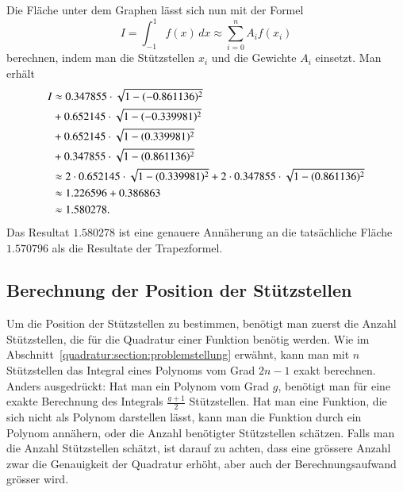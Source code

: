 Die Fläche unter dem Graphen lässt sich nun mit der Formel 
\begin{equation}
    I 
    =
    \int_{-1}^{1} f(x)\,dx 
    \approx
    \sum_{i=0}^{n} A_{i} f(x_{i})
\end{equation}
berechnen, indem man die Stützstellen $x_{i}$ und die Gewichte $A_{i}$ einsetzt.
Man erhält
\begin{align}
    \centering
    I 
    &\approx 
    0.347855 \cdot \sqrt{1-(-0.861136)^{2}} 
    \notag
    \\
    &+ 
    0.652145 \cdot \sqrt{1-(-0.339981)^{2}} 
    \notag
    \\
    &+ 
    0.652145 \cdot \sqrt{1-(0.339981)^{2}} 
    \notag
    \\
    &+ 
    0.347855 \cdot \sqrt{1-(0.861136)^{2}} 
    \notag
    \\
    &\approx 2 \cdot 0.652145 \cdot \sqrt{1-(0.339981)^{2}} + 2 \cdot 0.347855 \cdot \sqrt{1-(0.861136)^{2}} 
    \notag
    \\
    &\approx 1.226596 + 0.386863 
    \notag
    \\
    &\approx 1.580278.
\end{align}
Das Resultat $1.580278$ ist eine genauere Annäherung an die 
tatsächliche Fläche $1.570796$ als die Resultate der Trapezformel. 

\subsection{Berechnung der Position der Stützstellen
\label{quadratur:subsection:stützstellenberechnung}}
Um die Position der Stützstellen zu bestimmen, benötigt man zuerst die Anzahl Stützstellen, 
die für die Quadratur einer Funktion benötig werden.
Wie im Abschnitt~\ref{quadratur:section:problemstellung} erwähnt, 
kann man mit $n$ Stützstellen das Integral eines Polynoms vom Grad $2n-1$ exakt berechnen.
Anders ausgedrückt: Hat man ein Polynom vom Grad $g$, 
benötigt man für eine exakte Berechnung des Integrals $\frac{g+1}{2}$ Stützstellen.
Hat man eine Funktion, die sich nicht als Polynom darstellen lässt, 
kann man die Funktion durch ein Polynom annähern, 
oder die Anzahl benötigter Stützstellen schätzen.
Falls man die Anzahl Stützstellen schätzt, ist darauf zu achten, 
dass eine grössere Anzahl zwar die Genauigkeit der Quadratur erhöht,
aber auch der Berechnungsaufwand grösser wird.

